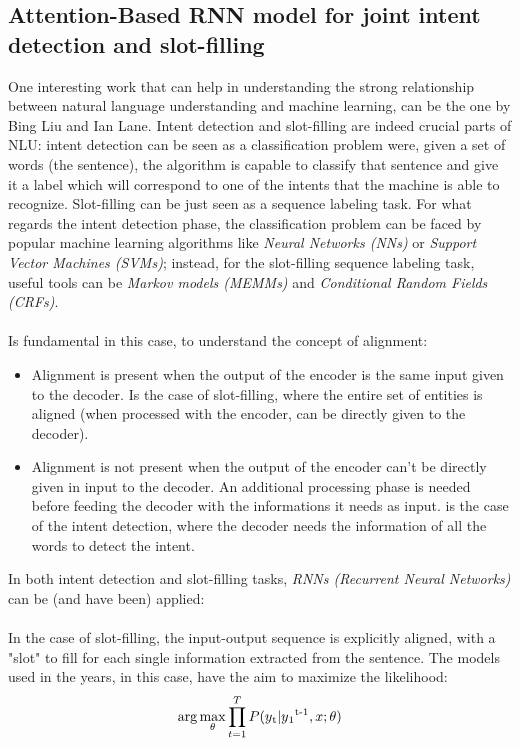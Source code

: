 \documentclass[a4paper,12pt]{report}
\begin{document}
	\subsection{Attention-Based RNN model for joint intent detection and slot-filling}
	One interesting work that can help in understanding the strong relationship between natural language understanding and machine learning, can be the one by Bing Liu and Ian Lane\cite{rnn}. Intent detection and slot-filling are indeed crucial parts of NLU: intent detection can be seen as a classification problem were, given a set of words (the sentence), the algorithm is capable to classify that sentence and give it a label which will correspond to one of the intents that the machine is able to recognize. Slot-filling can be just seen as a sequence labeling task. For what regards the intent detection phase, the classification problem can be faced by popular machine learning algorithms like \textit{Neural Networks (NNs)} or \textit{Support Vector Machines (SVMs)}; instead, for the slot-filling sequence labeling task, useful tools can be \textit{Markov models (MEMMs)} and \textit{Conditional Random Fields (CRFs)}.\\\\
	Is fundamental in this case, to understand the concept of alignment:
	\begin{itemize}
		\item Alignment is present when the output of the encoder is the same input given to the decoder. Is the case of slot-filling, where the entire set of entities is aligned (when processed with the encoder, can be directly given to the decoder).
		
		\item Alignment is not present when the output of the encoder can't be directly given in input to the decoder. An additional processing phase is needed before feeding the decoder with the informations it needs as input. is the case of the intent detection, where the decoder needs the information of all the words to detect the intent.
	\end{itemize}
	In both intent detection and slot-filling tasks, \textit{RNNs (Recurrent Neural Networks)} can be (and have been) applied:\\\\
	In the case of slot-filling, the input-output sequence is explicitly aligned, with a "slot" to fill for each single information extracted from the sentence. The models used in the years, in this case, have the aim to maximize the likelihood:
	\begin{equation}
	\arg \max_{\theta} \prod_{t=1}^{T} P(y\textsubscript{t}|y\textsubscript{1}\textsuperscript{t-1},x;\theta)
	\end{equation}
\end{document}
